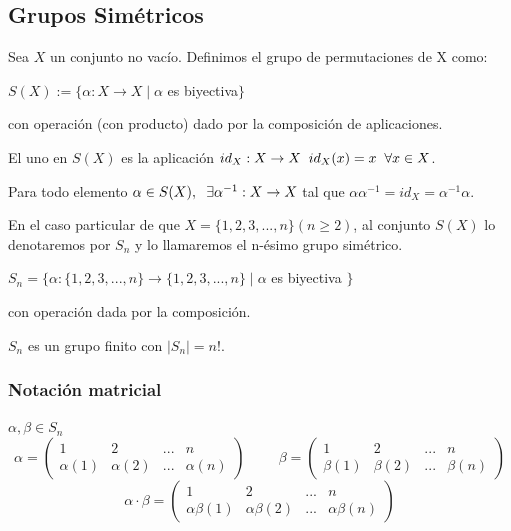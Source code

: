 \documentclass[11pt,a4paper]{article}
\begin{document}
\subsection{Grupos Simétricos}

Sea $X$ un conjunto no vacío. Definimos el grupo de permutaciones de X como:
\begin{center} $S(X) := \{\alpha: X \to X \mid \alpha$ es biyectiva$\}$ \end{center}
con operación (con producto) dado por la composición de aplicaciones.

El uno en $S(X)$ es la aplicación $id_{X}: X \to X \hspace{0.2cm} id_{X}(x) = x \hspace{0.2cm} \forall x \in X$.

Para todo elemento $\alpha \in S(X), \hspace{0.2cm} \exists \alpha^{-1}: X \to X$ tal que $\alpha \alpha^{-1} = id_{X} = \alpha^{-1} \alpha$.

En el caso particular de que $X = \{1,2,3,...,n\} (n \geq 2)$, al conjunto $S(X)$ lo denotaremos por $S_{n}$ y lo llamaremos el n-ésimo grupo simétrico.
\begin{center} $S_{n} = \{\alpha:\{1,2,3,...,n\} \to \{1,2,3,...,n\} \mid \alpha$ es biyectiva $\}$ \end{center}
con operación dada por la composición.

$S_{n}$ es un grupo finito con $|S_{n}| = n!$.

\subsubsection*{Notación matricial}

$\alpha, \beta \in S_{n}$
\begin{equation*}
\alpha = 
\begin{pmatrix}
1 & 2 & ... & n \\
\alpha(1) & \alpha(2) & ... & \alpha(n)
\end{pmatrix}
\hspace{1cm}
\beta = 
\begin{pmatrix}
1 & 2 & ... & n \\
\beta(1) & \beta(2) & ... & \beta(n)
\end{pmatrix}
\end{equation*}
\begin{equation*}
\alpha \cdot \beta = 
\begin{pmatrix}
1 & 2 & ... & n \\
\alpha\beta(1) & \alpha\beta(2) & ... & \alpha\beta(n)
\end{pmatrix}
\end{equation*}
\end{document}
